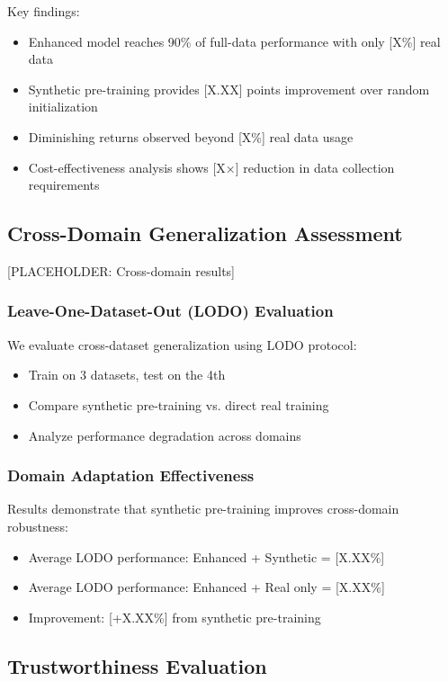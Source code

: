 \documentclass[journal]{IEEEtran}
\begin{document}
Key findings:
\begin{itemize}
\item Enhanced model reaches 90\% of full-data performance with only [X\%] real data
\item Synthetic pre-training provides [X.XX] points improvement over random initialization
\item Diminishing returns observed beyond [X\%] real data usage
\item Cost-effectiveness analysis shows [X×] reduction in data collection requirements
\end{itemize}

\subsection{Cross-Domain Generalization Assessment}

[PLACEHOLDER: Cross-domain results]

\subsubsection{Leave-One-Dataset-Out (LODO) Evaluation}

We evaluate cross-dataset generalization using LODO protocol:
\begin{itemize}
\item Train on 3 datasets, test on the 4th
\item Compare synthetic pre-training vs. direct real training
\item Analyze performance degradation across domains
\end{itemize}

\subsubsection{Domain Adaptation Effectiveness}

Results demonstrate that synthetic pre-training improves cross-domain robustness:
\begin{itemize}
\item Average LODO performance: Enhanced + Synthetic = [X.XX\%]
\item Average LODO performance: Enhanced + Real only = [X.XX\%]
\item Improvement: [+X.XX\%] from synthetic pre-training
\end{itemize}

\subsection{Trustworthiness Evaluation}
\end{document}
